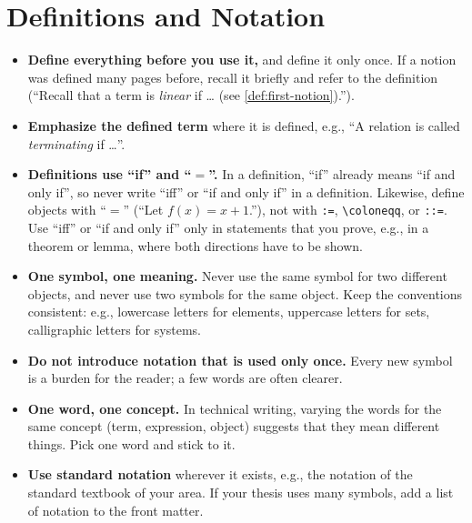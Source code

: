 \section{Definitions and Notation}\label{sec:mw-notation}

\begin{itemize}
    \item \textbf{Define everything before you use it,} and define it only
          once.
          If a notion was defined many pages before, recall it briefly and
          refer to the definition (``Recall that a term is \emph{linear} if
          \ldots{} (see \cref{def:first-notion}).'').
    \item \textbf{Emphasize the defined term} where it is defined, e.g.,
          ``A relation is called \emph{terminating} if \ldots''.
    \item \textbf{Definitions use ``if'' and ``$=$''.}
          In a definition, ``if'' already means ``if and only if'', so never
          write ``iff'' or ``if and only if'' in a definition.
          Likewise, define objects with ``$=$'' (``Let $f(x) = x + 1$.''),
          not with \lstinline|:=|, \lstinline|\coloneqq|, or
          \lstinline|::=|.
          Use ``iff'' or ``if and only if'' only in statements that you prove,
          e.g., in a theorem or lemma, where both directions have to be shown.
    \item \textbf{One symbol, one meaning.}
          Never use the same symbol for two different objects, and never use
          two symbols for the same object.
          Keep the conventions consistent: e.g., lowercase letters for
          elements, uppercase letters for sets, calligraphic letters for
          systems.
    \item \textbf{Do not introduce notation that is used only once.}
          Every new symbol is a burden for the reader; a few words are often
          clearer.
    \item \textbf{One word, one concept.}
          In technical writing, varying the words for the same concept (term,
          expression, object) suggests that they mean different things.
          Pick one word and stick to it.
    \item \textbf{Use standard notation} wherever it exists, e.g., the
          notation of the standard textbook of your area.
          If your thesis uses many symbols, add a list of notation to the
          front matter.
\end{itemize}

